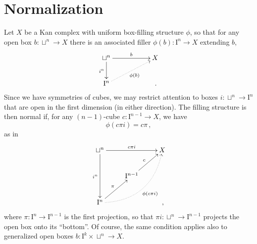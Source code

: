 \documentclass[12pt]{article}
\newcommand{\I}{\ensuremath{\mathrm{I}}}
\theoremstyle{remark}
\theoremstyle{definition}
\begin{document}
\section{Normalization}

Let $X$ be a Kan complex with uniform box-filling structure $\phi$, so that for any open box $b: \sqcup^n \to X$ there is an associated filler $\phi(b) : \I^n \to X$ extending $b$,
\[
\xymatrix{
\sqcup^n \ar[d]_{i^n} \ar[rr]^-{b} && X\\
\I^n \ar@{..>}[urr]_{\phi(b)} &&\,.
}
\]
Since we have symmetries of cubes, we may restrict attention to boxes $i : \sqcup^n \to \I^n$ that are open in the first dimension (in either direction).  The filling structure is then normal if, for any $(n-1)$-cube $c : \I^{n-1}\to X$, we have
\[
\phi(c\pi i) = c\pi\,,
\]
as in
\[
\xymatrix{
\sqcup^n \ar[dd]_{i^n} \ar[rr]^-{c\pi i} && X\\
	& \I^{n-1} \ar[ur]^c & \\
\I^n  \ar[ru]^{\pi} \ar@/{}_{2pc}/@{..>}[rruu]_{\phi(c\pi i)} &&\,,
}
\]
where $\pi : \I^n \to \I^{n-1}$ is the first projection, so that   $\pi i : \sqcup^n \to \I^{n-1}$ projects the open box onto its ``bottom''.  
Of course, the same condition applies also to generalized open boxes $b: \I^k\times\sqcup^n \to X$.
\end{document}
